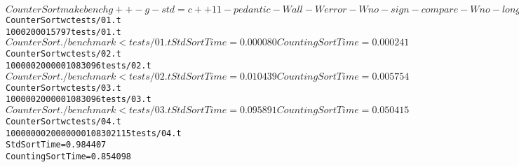 \documentclass[pdf, unicode, 12pt, a4paper,oneside,fleqn]{article}
\begin{document}
\begin{alltt}
$ CounterSort make bench
g++ -g -std=c++11 -pedantic -Wall -Werror -Wno-sign-compare -Wno-long-long -O2 
-c benchmark.cpp
g++ -g -std=c++11 -pedantic -Wall -Werror -Wno-sign-compare -Wno-long-long -O2 
-o benchmark benchmark.o -lm
$ CounterSort wc tests/01.t
	1000    2000   15797 tests/01.t
$ CounterSort ./benchmark < tests/01.t
Std SortTime = 0.000080
Counting SortTime = 0.000241

$ CounterSort wc tests/02.t
	100000  200000 1083096 tests/02.t
$ CounterSort ./benchmark < tests/02.t 
Std SortTime = 0.010439
Counting SortTime = 0.005754

$ CounterSort wc tests/03.t
	100000  200000 1083096 tests/03.t
$ CounterSort ./benchmark < tests/03.t 
Std SortTime = 0.095891
Counting SortTime = 0.050415

$ CounterSort wc tests/04.t
	10000000 20000000 108302115 tests/04.t
Std SortTime = 0.984407
Counting SortTime = 0.854098
\end{alltt}
\pagebreak
\end{document}
